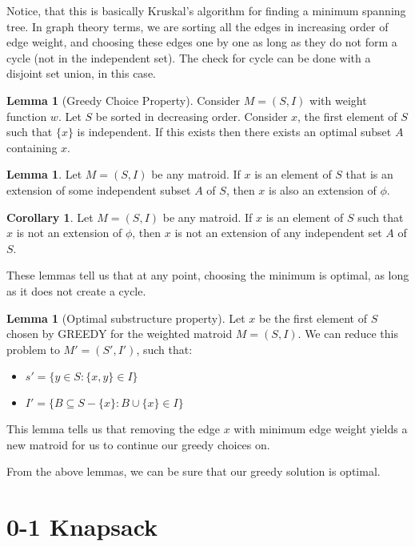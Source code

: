 \documentclass[12pt,letterpaper]{article}
\theoremstyle{definition}
\newtheorem{corollary}{Corollary}[theorem] %
\newtheorem{lemma}[theorem]{Lemma} %
\begin{document}
Notice, that this is basically Kruskal's algorithm for finding a minimum spanning tree. In graph theory terms, we are sorting all the edges in increasing order of edge weight, and choosing these edges one by one as long as they do not form a cycle (not in the independent set). The check for cycle can be done with a disjoint set union, in this case.

\begin{lemma}[Greedy Choice Property]
  Consider $M = (S,I)$ with weight function $w$. Let $S$ be sorted in decreasing order. Consider $x$, the first element of $S$ such that $\{x\} $ is independent. If this exists then there exists an optimal subset $A$ containing $x$.
\end{lemma}

\begin{lemma}
  Let $M = (S,I)$ be any matroid. If $x$ is an element of $S$ that is an extension of some independent subset $A$ of $S$, then $x$ is also an extension of $\phi$.
\end{lemma}

\begin{corollary}
  Let $M = (S,I)$ be any matroid. If $x$ is an element of $S$ such that $x$ is not an extension of $\phi$, then $x$ is not an extension of any independent set $A$ of $S$.
\end{corollary}

These lemmas tell us that at any point, choosing the minimum is optimal, as long as it does not create a cycle.

\begin{lemma}[Optimal substructure property]
  Let $x$ be the first element of $S$ chosen by GREEDY for the weighted matroid $M = (S,I)$. We can reduce this problem to $M' = (S',I')$, such that:
  \begin{itemize}
    \item $s' = \{y \in S : \{x,y\} \in I\}$
    \item $I' = \{B \subseteq S - \{x\} : B \cup \{x\} \in I\}$
  \end{itemize}
\end{lemma}

This lemma tells us that removing the edge $x$ with minimum edge weight yields a new matroid for us to continue our greedy choices on.

From the above lemmas, we can be sure that our greedy solution is optimal.

\section{0-1 Knapsack}
\end{document}
